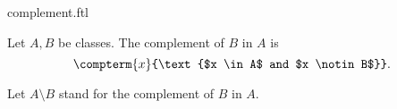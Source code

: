 \documentclass{article}
\begin{document}
\begin{smodule}{complement.ftl}

  \begin{fdefinition*}[label=7620345041256448]
    Let $A, B$ be classes.
    The complement of $B$ in $A$ is
    \[\compterm{x}{\text{$x \in A$ and $x \notin B$}}.\]
  \end{fdefinition*}

  \begin{fconvention*}
    Let $A \setminus B$ stand for the complement of $B$ in $A$.
  \end{fconvention*}
\end{smodule}
\end{document}
